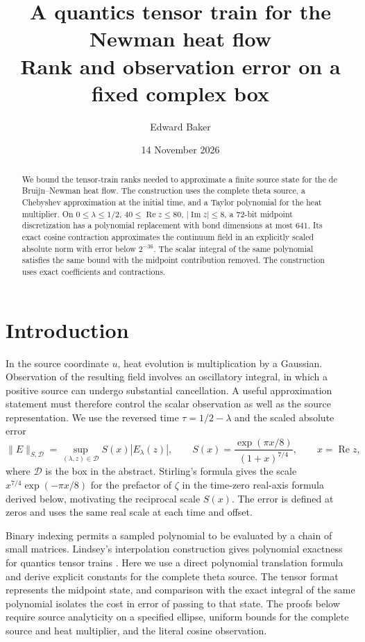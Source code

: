 \documentclass[11pt]{article}
\title{A quantics tensor train for the Newman heat flow\\
       \large Rank and observation error on a fixed complex box}
\author{Edward Baker}
\date{14 November 2026}
\newcommand{\boxD}{\mathcal D}
\begin{document}
\maketitle

\begin{abstract}
We bound the tensor-train ranks needed to approximate a finite source
state for the de Bruijn--Newman heat flow. The construction uses the
complete theta source, a Chebyshev approximation at the initial time,
and a Taylor polynomial for the heat multiplier. On
\(0\le\lambda\le1/2\), \(40\le\operatorname{Re} z\le80\),
\(\lvert\operatorname{Im} z\rvert\le8\), a 72-bit midpoint
discretization has a polynomial replacement with bond dimensions at most
\(641\). Its exact cosine contraction approximates the continuum
field in an explicitly scaled absolute norm with error below \(2^{-36}\).
The scalar integral of the same polynomial satisfies the same bound
with the midpoint contribution removed. The construction uses exact
coefficients and contractions.
\end{abstract}

\section{Introduction}

In the source coordinate \(u\), heat evolution is multiplication by a
Gaussian. Observation of the resulting field involves an oscillatory
integral, in which a positive source can undergo substantial cancellation.
A useful approximation statement must therefore control the scalar
observation as well as the source representation. We use the reversed
time \(\tau=1/2-\lambda\) and the scaled absolute error
\[
 \|E\|_{S,\boxD}=\sup_{(\lambda,z)\in\boxD}S(x)|E_\lambda(z)|,
 \qquad
 S(x)=\frac{\exp(\pi x/8)}{(1+x)^{7/4}},
 \qquad x=\operatorname{Re}z,
\]
where \(\boxD\) is the box in the abstract. Stirling's formula
\cite[Eq.~5.11.9]{dlmf} gives the scale \(x^{7/4}\exp(-\pi x/8)\)
for the prefactor of \(\zeta\) in the time-zero real-axis formula
derived below, motivating the reciprocal scale \(S(x)\). The error is
defined at zeros and uses the same real scale at each time and offset.

Binary indexing permits a sampled polynomial to be evaluated by a
chain of small matrices. Lindsey's interpolation construction gives
polynomial exactness for quantics tensor trains \cite[\S4.1]{lindsey}.
Here we use a direct polynomial translation formula and derive explicit
constants for the complete theta source. The tensor format represents
the midpoint state, and comparison with the exact integral of the same
polynomial isolates the cost in error of passing to that state.
The proofs below require source analyticity on a specified ellipse,
uniform bounds for the complete source and heat multiplier, and the
literal cosine observation.
\end{document}
